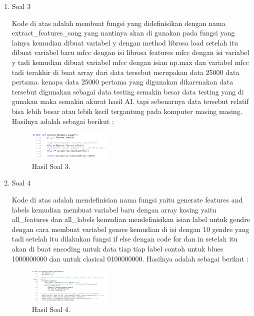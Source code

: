 \begin{enumerate}
	\item Soal 3
	\hfill\break
	
	Kode di atas adalah membuat fungsi yang didefinisikan dengan nama extract\_features\_song yang nantinya akan di gunakan pada fungsi yang lainya kemudian dibuat variabel y dengan method librosa load setelah itu dibuat variabel baru mfcc dengan isi librosa features mfcc dengan isi variabel y tadi kemudian dibuat variabel mfcc dengan isian np.max dan variabel mfcc tadi terakhir di buat array dari data tersebut merupakan data 25000 data pertama. kenapa data 25000 pertama yang digunakan dikarenakan data tersebut digunakan sebagai data testing semakin besar data testing yang di gunakan maka semakin akurat hasil AI. tapi sebenarnya data tersebut relatif bisa lebih besar atau lebih kecil tergantung pada komputer masing masing. Hasilnya adalah sebagai berikut :
	\begin{figure}[H]
	\centering
		\includegraphics[width=4cm]{figures/1174087/6/10.png}
		\caption{Hasil Soal 3.}
	\end{figure}

	\item Soal 4
	\hfill\break
	
	Kode di atas adalah mendefinisian nama fungsi yaitu generate features and labels kemudian membuat variabel baru dengan array kosing yaitu all\_features dan all\_labels kemudian mendefinisikan isian label untuk gendre dengan cara membuat variabel genres kemudian di isi dengan 10 gendre yang tadi setelah itu dilakukan fungsi if else dengan code for dan in setelah itu akan di buat encoding untuk data tiap tiap label contoh untuk blues 1000000000 dan untuk clasical 0100000000. Hasilnya adalah sebagai berikut :
	\begin{figure}[H]
	\centering
		\includegraphics[width=4cm]{figures/1174087/6/11.png}
		\caption{Hasil Soal 4.}
	\end{figure}


\end{enumerate}
